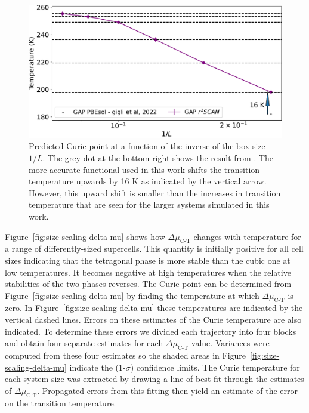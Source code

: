 \begin{figure}
    \centering
    \includegraphics[width=0.8\linewidth]{fig/Size-scaling-Temp.pdf}
    \caption{Predicted Curie point at a function of the inverse of the box size $1/L$.  The grey dot at the bottom right shows the result from \cite{gigli_thermodynamics_2022}. The more accurate functional used in this work shifts the transition temperature upwards by 16 K as indicated by the vertical arrow. However, this upward shift is smaller than the increases in transition temperature that are seen for the larger systems simulated in this work.}
    \label{fig:size-scaling-temp}
\end{figure}

Figure~\ref{fig:size-scaling-delta-mu} shows how $\Delta\mu_{\textrm{C-T}}$ changes with temperature for a range of differently-sized supercells.  This quantity is initially positive for all cell sizes indicating that the tetragonal phase is more stable than the cubic one at low temperatures.  It becomes negative at high temperatures when the relative stabilities of the two phases reverses.  The Curie point can be determined from Figure~\ref{fig:size-scaling-delta-mu} by finding the temperature at which $\Delta\mu_{\textrm{C-T}}$ is zero.  In Figure~\ref{fig:size-scaling-delta-mu} these temperatures are indicated by the vertical dashed lines.  Errors on these estimates of the Curie temperature are also indicated. To determine these errors we divided each trajectory into four blocks and obtain four separate estimates for each $\Delta\mu_{\textrm{C-T}}$ value.  Variances were computed from these four estimates so the shaded areas in Figure~\ref{fig:size-scaling-delta-mu} indicate the (1-$\sigma$) confidence limits.  The Curie temperature for each system size was extracted by drawing a line of best fit through the estimates of    $\Delta\mu_{\textrm{C-T}}$.  Propagated errors from this fitting then yield an estimate of the error on the transition temperature.

